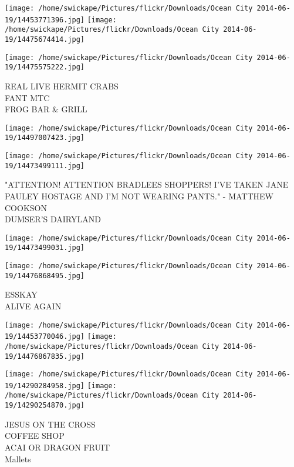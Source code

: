 \documentclass[10pt,letterpaper]{article}
\begin{document}
\texttt{[image: /home/swickape/Pictures/flickr/Downloads/Ocean City 2014-06-19/14453771396.jpg]}
\texttt{[image: /home/swickape/Pictures/flickr/Downloads/Ocean City 2014-06-19/14475674414.jpg]}

\texttt{[image: /home/swickape/Pictures/flickr/Downloads/Ocean City 2014-06-19/14475575222.jpg]}

REAL LIVE HERMIT CRABS\\
FANT MTC\\
FROG BAR \& GRILL\\
\pagebreak

\texttt{[image: /home/swickape/Pictures/flickr/Downloads/Ocean City 2014-06-19/14497007423.jpg]}

\vspace{0.25in}
\texttt{[image: /home/swickape/Pictures/flickr/Downloads/Ocean City 2014-06-19/14473499111.jpg]}

"ATTENTION!  ATTENTION BRADLEES SHOPPERS!  I'VE TAKEN JANE PAULEY HOSTAGE AND I'M NOT WEARING PANTS." {-} MATTHEW COOKSON\\
DUMSER'S DAIRYLAND\\
\pagebreak

\texttt{[image: /home/swickape/Pictures/flickr/Downloads/Ocean City 2014-06-19/14473499031.jpg]}

\vspace{0.25in}
\texttt{[image: /home/swickape/Pictures/flickr/Downloads/Ocean City 2014-06-19/14476868495.jpg]}

ESSKAY\\
ALIVE AGAIN\\
\pagebreak

\texttt{[image: /home/swickape/Pictures/flickr/Downloads/Ocean City 2014-06-19/14453770046.jpg]}
\texttt{[image: /home/swickape/Pictures/flickr/Downloads/Ocean City 2014-06-19/14476867835.jpg]}

\texttt{[image: /home/swickape/Pictures/flickr/Downloads/Ocean City 2014-06-19/14290284958.jpg]}
\texttt{[image: /home/swickape/Pictures/flickr/Downloads/Ocean City 2014-06-19/14290254870.jpg]}

JESUS ON THE CROSS\\
COFFEE SHOP\\
ACAI OR DRAGON FRUIT\\
Mallets\\
\pagebreak
\end{document}
